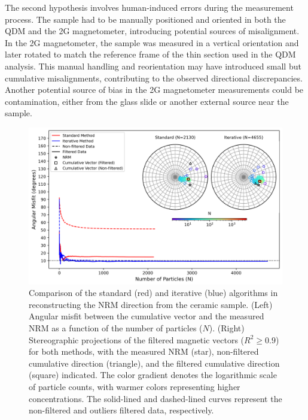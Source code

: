 The second hypothesis involves human-induced errors during the measurement process. The sample had to be manually positioned and oriented in both the QDM and the 2G magnetometer, introducing potential sources of misalignment. In the 2G magnetometer, the sample was measured in a vertical orientation and later rotated to match the reference frame of the thin section used in the QDM analysis. This manual handling and reorientation may have introduced small but cumulative misalignments, contributing to the observed directional discrepancies. Another potential source of bias in the 2G magnetometer measurements could be contamination, either from the glass slide or another external source near the sample.

\begin{figure}[tb!]
  \centering
  \includegraphics[width=1\linewidth]{paper/figures/ceramic-data-stereoplot.png}
  \caption{
  Comparison of the standard (red) and iterative (blue) algorithms in reconstructing the NRM direction from the ceramic sample. (Left) Angular misfit between the cumulative vector and the measured NRM as a function of the number of particles ($N$). (Right) Stereographic projections of the filtered magnetic vectors ($R^2 \geq 0.9$) for both methods, with the measured NRM (star), non-filtered cumulative direction (triangle), and the filtered cumulative direction (square) indicated. The color gradient denotes the logarithmic scale of particle counts, with warmer colors representing higher concentrations. The solid-lined and dashed-lined curves represent the non-filtered and outliers filtered data, respectively.
  }
  \label{ceramic-data-stereograms}
\end{figure}

